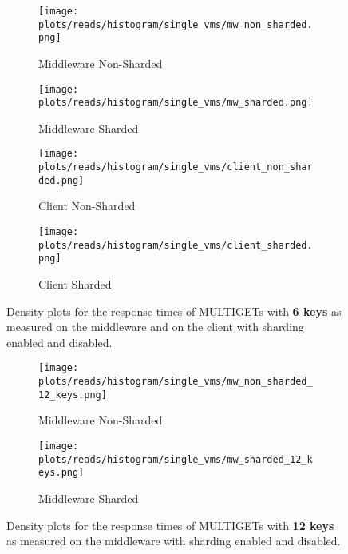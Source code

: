 \documentclass[11pt,a4paper]{article}
\let\tb\textbf
\begin{document}
\begin{figure}
\centering
\begin{subfigure}{.5\textwidth}
    \centering
    \texttt{[image: plots/reads/histogram/single\_vms/mw\_non\_sharded.png]}
    \caption{Middleware Non-Sharded}
    \label{plt:hist:single_mw_non_shard}
\end{subfigure}%
\begin{subfigure}{.5\textwidth}
    \centering
    \texttt{[image: plots/reads/histogram/single\_vms/mw\_sharded.png]}
    \caption{Middleware Sharded}
    \label{plt:hist:single_mw_shard}

\end{subfigure}
\begin{subfigure}{.5\textwidth}
    \centering
    \texttt{[image: plots/reads/histogram/single\_vms/client\_non\_sharded.png]}
    \caption{Client Non-Sharded}
    \label{plt:hist:single_client_non_shard}

\end{subfigure}%
\begin{subfigure}{.5\textwidth}
    \centering
    \texttt{[image: plots/reads/histogram/single\_vms/client\_sharded.png]}
    \caption{Client Sharded}
    \label{plt:hist:single_client_shard}

\end{subfigure}
\caption{Density plots for the response times of MULTIGETs with \tb{6 keys} as measured on the middleware and on the client with sharding enabled and disabled.}
\label{plt:hist:single_vms}
\end{figure}


\begin{figure}
\centering
\begin{subfigure}{.5\textwidth}
    \centering
    \texttt{[image: plots/reads/histogram/single\_vms/mw\_non\_sharded\_12\_keys.png]}
    \caption{Middleware Non-Sharded}
    \label{plt:hist:single_mw_non_shard_12_keys}
\end{subfigure}%
\begin{subfigure}{.5\textwidth}
    \centering
    \texttt{[image: plots/reads/histogram/single\_vms/mw\_sharded\_12\_keys.png]}
    \caption{Middleware Sharded}
    \label{plt:hist:single_mw_shard_12_keys}
\end{subfigure}
\caption{Density plots for the response times of MULTIGETs with \tb{12 keys} as measured on the middleware with sharding enabled and disabled.}
\label{plt:hist:single_vms_12_keys}
\end{figure}
\end{document}
